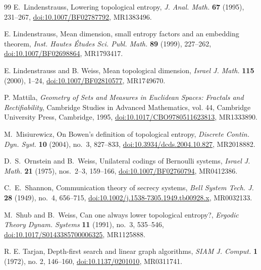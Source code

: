 \documentclass[12pt,letterpaper,reqno]{amsart}
\theoremstyle{definition}
\theoremstyle{remark}
\numberwithin{equation}{section}
\begin{document}
\begin{sloppypar}
\begin{thebibliography}{99}
			E.~Lindenstrauss,
			Lowering topological entropy,
			\emph{J. Anal. Math.} \textbf{67} (1995), 231--267,
			\href{https://doi.org/10.1007/BF02787792}
			{doi:10.1007/\allowbreak BF02787792},
			MR1383496.
			
			E. Lindenstrauss, Mean dimension, small entropy factors and an embedding theorem, \emph{Inst. Hautes \'Etudes Sci. Publ. Math.} \textbf{89} (1999),
			227--262, 
			\href{https://doi:10.1007/BF02698864}
			{doi:10.1007/\allowbreak BF02698864}, MR1793417.
			
			E. Lindenstrauss and B. Weiss, Mean topological dimension, \emph{Israel J. Math.} \textbf{115} (2000), 1--24,
			\href{https://doi:10.1007/BF02810577} {doi:10.1007/\allowbreak BF02810577}, MR1749670.
			
			P. Mattila, \emph{Geometry of Sets and Measures in Euclidean Spaces: Fractals and Rectifiability}, Cambridge Studies in Advanced Mathematics, vol. 44, Cambridge University Press, Cambridge, 1995, \href{https://doi:10.1017/CBO9780511623813}{doi:10.1017/CBO9780511623813}, MR1333890.
			
			
			M.~Misiurewicz,
			On Bowen's definition of topological entropy,
			\emph{Discrete Contin. Dyn. Syst.} \textbf{10} (2004), no.~3, 827--833,
			\href{https://doi.org/10.3934/dcds.2004.10.827}
			{doi:10.3934/dcds.2004.10.827},
			MR2018882.
			
			D.~S.~Ornstein and B.~Weiss,
			Unilateral codings of Bernoulli systems,
			\emph{Israel J. Math.} \textbf{21} (1975), nos.~2--3, 159--166,
			\href{https://doi.org/10.1007/BF02760794}
			{doi:10.1007/BF02760794},
			MR0412386.
			
			C.~E.~Shannon,
			Communication theory of secrecy systems,
			\emph{Bell System Tech. J.} \textbf{28} (1949), no.~4, 656--715,
			\href{https://doi.org/10.1002/j.1538-7305.1949.tb00928.x}
			{doi:10.1002/j.1538-7305.1949.tb00928.x},
			MR0032133.
			
			M.~Shub and B.~Weiss,
			Can one always lower topological entropy?,
			\emph{Ergodic Theory Dynam. Systems} \textbf{11} (1991), no.~3, 535--546,
			\href{https://doi.org/10.1017/S0143385700006325}
			{doi:10.1017/S0143385700006325},
			MR1125888.
			
			R. E. Tarjan, Depth-first search and linear graph algorithms, \emph{SIAM J. Comput.} \textbf{1} (1972), no. 2, 146--160, \href{http://doi:10.1137/0201010}{doi:10.1137/0201010}, MR0311741.
			

\end{thebibliography}
\end{sloppypar}
\end{document}
